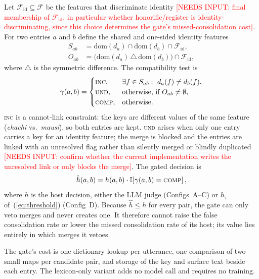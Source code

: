 \documentclass[conference]{IEEEtran}
\newcommand{\pending}[1]{\textcolor{red}{#1}}
\newcommand{\Comp}{\textsc{comp}}
\newcommand{\Inc}{\textsc{inc}}
\newcommand{\Und}{\textsc{und}}
\begin{document}
Let $\mathcal{F}_{\mathrm{id}} \subseteq \mathcal{F}$ be the features
that discriminate identity
\pending{[NEEDS INPUT: final membership of $\mathcal{F}_{\mathrm{id}}$, in
particular whether honorific/register is identity-discriminating, since
this choice determines the gate's missed-consolidation cost]}. For two
entries $a$ and $b$ define the shared and one-sided identity features
\begin{align}
S_{ab} &= \mathrm{dom}(d_a) \cap \mathrm{dom}(d_b) \cap \mathcal{F}_{\mathrm{id}},\\
O_{ab} &= \big(\mathrm{dom}(d_a) \,\triangle\, \mathrm{dom}(d_b)\big) \cap \mathcal{F}_{\mathrm{id}},
\end{align}
where $\triangle$ is the symmetric difference. The compatibility test is
\begin{equation}
\gamma(a,b)=
\begin{cases}
\Inc, & \exists f \in S_{ab}:\ d_a(f) \neq d_b(f),\\
\Und, & \text{otherwise, if } O_{ab} \neq \emptyset,\\
\Comp, & \text{otherwise.}
\end{cases}
\label{eq:compat}
\end{equation}
\Inc{} is a cannot-link constraint: the keys are different values of the
same feature (\textit{chachi} vs.\ \textit{mausi}), so both entries are
kept. \Und{} arises when only one entry carries a key for an identity
feature; the merge is blocked and the entries are linked with an
unresolved flag rather than silently merged or blindly duplicated
\pending{[NEEDS INPUT: confirm whether the current implementation writes
the unresolved link or only blocks the merge]}. The gated decision is
\begin{equation}
\hat{h}(a,b) = h(a,b)\cdot \mathbb{I}\!\left[\gamma(a,b) = \Comp\right],
\label{eq:gate}
\end{equation}
where $h$ is the host decision, either the LLM judge (Configs~A--C) or
$h_\tau$ of~(\ref{eq:threshold}) (Config~D). Because $\hat{h} \le h$ for
every pair, the gate can only veto merges and never creates one. It
therefore cannot raise the false consolidation rate or lower the missed
consolidation rate of its host; its value lies entirely in which merges it
vetoes.

The gate's cost is one dictionary lookup per utterance, one comparison of
two small maps per candidate pair, and storage of the key and surface text
beside each entry. The lexicon-only variant adds no model call and
requires no training.
\end{document}
